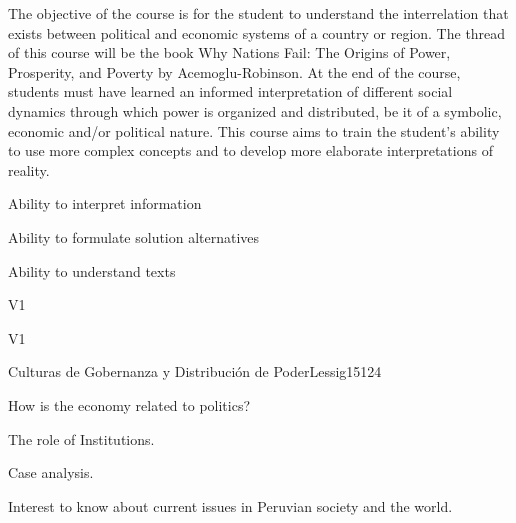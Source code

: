 \begin{syllabus}


\begin{justification}
The objective of the course is for the student to understand the interrelation that exists between political and economic systems of a country or region. The thread of this course will be the book Why Nations Fail: The Origins of Power, Prosperity, and Poverty by Acemoglu-Robinson.
At the end of the course, students must have learned an informed interpretation of different social dynamics through which power is organized and distributed, be it of a symbolic, economic and/or political nature. This course aims to train the student's ability to use more complex concepts and to develop more elaborate interpretations of reality. 
\end{justification}

\begin{goals}
\item Ability to interpret information
\item Ability to formulate solution alternatives
\item Ability to understand texts 
\end{goals}

\begin{outcomes}{V1}
    \item {}
    \item {}
    \item {}
    
\end{outcomes}

\begin{competences}{V1}
    \item {}
    \item {}
    \item {}
    \item {}
\end{competences}

\begin{unit}{Culturas de Gobernanza y Distribución de Poder}{}{Lessig15}{12}{4}
   \begin{topics}
      \item How is the economy related to politics?
      \item The role of Institutions.
      \item Case analysis.
   \end{topics}
   \begin{learningoutcomes}
      \item Interest to know about current issues in Peruvian society and the world.
   \end{learningoutcomes}
\end{unit}

\begin{coursebibliography}
\end{coursebibliography}

\end{syllabus}
